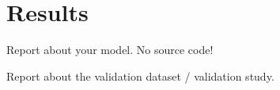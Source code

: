 \section{Results}
Report about your model. No source code!

Report about the validation dataset / validation study. 